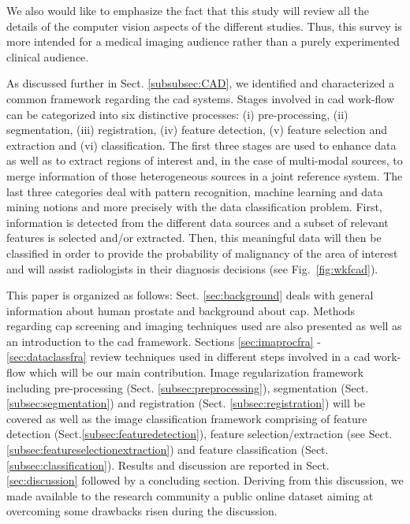 We also would like to emphasize the fact that this study will review all the details of the computer vision aspects of the different studies. Thus, this survey is more intended for a medical imaging audience rather than a purely experimented clinical audience.

As discussed further in Sect. \ref{subsubsec:CAD}, we identified and characterized a common framework regarding the \acs{cad} systems. Stages involved in \acs{cad} work-flow can be categorized into six distinctive processes: (i) pre-processing, (ii) segmentation, (iii) registration, (iv) feature detection, (v) feature selection and extraction and (vi) classification. The first three stages are used to enhance data as well as to extract regions of interest and, in the case of multi-modal sources, to merge information of those heterogeneous sources in a joint reference system. The last three categories deal with pattern recognition, machine learning and data mining notions and more precisely with the data classification problem. First, information is detected from the different data sources and a subset of relevant features is selected and/or extracted. Then, this meaningful data will then be classified in order to provide the probability of malignancy of the area of interest and will assist radiologists in their diagnosis decisions (see Fig.~\ref{fig:wkfcad}).

This paper is organized as follows: Sect. \ref{sec:background} deals with general information about human prostate and background about \ac{cap}. Methods regarding \ac{cap} screening and imaging techniques used are also presented as well as an introduction to the \acs{cad} framework. Sections \ref{sec:imaprocfra} - \ref{sec:dataclassfra} review techniques used in different steps involved in a \acs{cad} work-flow which will be our main contribution. Image regularization framework including pre-processing (Sect. \ref{subsec:preprocessing}), segmentation (Sect. \ref{subsec:segmentation}) and registration (Sect. \ref{subsec:registration}) will be covered as well as the image classification framework comprising of feature detection (Sect.\ref{subsec:featuredetection}), feature selection/extraction (see Sect. \ref{subsec:featureselectionextraction}) and feature classification (Sect. \ref{subsec:classification}). Results and discussion are reported in Sect. \ref{sec:discussion} followed by a concluding section. Deriving from this discussion, we made available to the research community a public online dataset aiming at overcoming some drawbacks risen during the discussion.